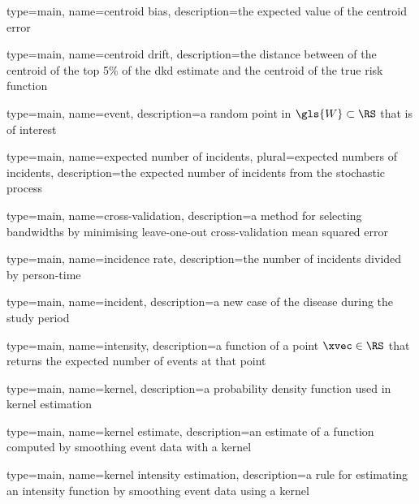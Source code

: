 

{%
   type=main,
   name={centroid bias},
   description={the expected value of the centroid error}
}

{%
   type=main,
   name={centroid drift},
   description={the distance between of the centroid of the top 5\% of the dkd estimate and the centroid of the true risk function}
}

{%
   type=main,
   name={event},
   description={a random point in $\gls{W} \subset \RS$ that is of interest}
}

{%
   type=main,
   name={expected number of incidents},
   plural={expected numbers of incidents},
   description={the expected number of incidents from the stochastic process}
}

{%
   type=main,
   name={cross-validation},
   description={a method for selecting bandwidths by minimising leave-one-out cross-validation mean squared error}
}

{
   type=main,
   name={incidence rate},
   description={the number of incidents divided by person-time}
}

{
   type=main,
   name={incident},
   description={a new case of the disease during the study period}
}

{
   type=main,
   name={intensity},
   description={a function of a point $\xvec \in \RS$ that returns the expected number of events at that point}
}

{
   type=main,
   name={kernel},
   description={a probability density function used in kernel estimation}
}

{
   type=main,
   name={kernel estimate},
   description={an estimate of a function computed by smoothing event data with a kernel}
}

{
   type=main,
   name={kernel intensity estimation},
   description={a rule for estimating an intensity function by smoothing event data using a kernel}
}

